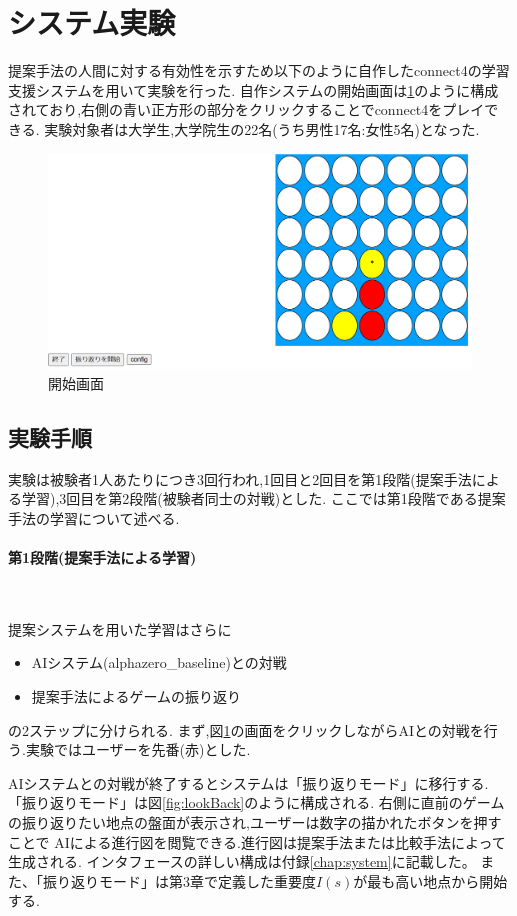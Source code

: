 \section{システム実験}
提案手法の人間に対する有効性を示すため以下のように自作したconnect4の学習支援システムを用いて実験を行った.
自作システムの開始画面は\ref{fig:basic}のように構成されており,右側の青い正方形の部分をクリックすることでconnect4をプレイできる.
実験対象者は大学生,大学院生の22名(うち男性17名:女性5名)となった.
\begin{figure}[t]
	\centering
	\includegraphics[width=\linewidth]{./figure/basicSystem.png}
	\caption{開始画面}
	\label{fig:basic}
\end{figure}
\subsection{実験手順}
実験は被験者1人あたりにつき3回行われ,1回目と2回目を第1段階(提案手法による学習),3回目を第2段階(被験者同士の対戦)とした.
ここでは第1段階である提案手法の学習について述べる.
\newpage
\paragraph{第1段階(提案手法による学習)}~
\par 提案システムを用いた学習はさらに
\begin{itemize}
	\item AIシステム(alphazero\_baseline)との対戦
	\item 提案手法によるゲームの振り返り
\end{itemize}
の2ステップに分けられる.
まず,図\ref{fig:basic}の画面をクリックしながらAIとの対戦を行う.実験ではユーザーを先番(赤)とした.


AIシステムとの対戦が終了するとシステムは「振り返りモード」に移行する.
「振り返りモード」は図\ref{fig:lookBack}のように構成される.
右側に直前のゲームの振り返りたい地点の盤面が表示され,ユーザーは数字の描かれたボタンを押すことで
AIによる進行図を閲覧できる.進行図は提案手法または比較手法によって生成される.
インタフェースの詳しい構成は付録\ref{chap:system}に記載した。
また、「振り返りモード」は第3章で定義した重要度$I(s)$が最も高い地点から開始する.

